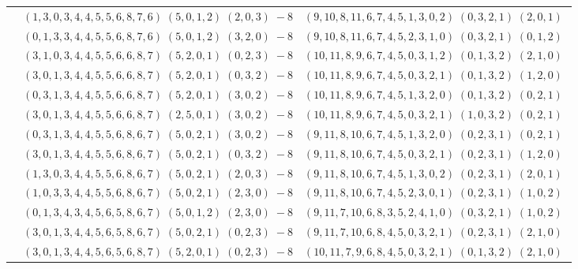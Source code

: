 \documentclass[11pt]{article}
\begin{document}
\begin{longtable}[l]{|c|c|c|}
 \cline{2-3} 
 & $(1 ,3 ,0 ,3 ,4 ,4 ,5 ,5 ,6 ,8 ,7 ,6) \;(5 ,0 ,1 ,2) \;(2 ,0 ,3) \;-8$ & $(9 ,10 ,8 ,11 ,6 ,7 ,4 ,5 ,1 ,3 ,0 ,2) \;(0 ,3 ,2 ,1) \;(2 ,0 ,1) \;$\\ 
 \cline{2-3} 
 & $(0 ,1 ,3 ,3 ,4 ,4 ,5 ,5 ,6 ,8 ,7 ,6) \;(5 ,0 ,1 ,2) \;(3 ,2 ,0) \;-8$ & $(9 ,10 ,8 ,11 ,6 ,7 ,4 ,5 ,2 ,3 ,1 ,0) \;(0 ,3 ,2 ,1) \;(0 ,1 ,2) \;$\\ 
 \cline{2-3} 
 & $(3 ,1 ,0 ,3 ,4 ,4 ,5 ,5 ,6 ,6 ,8 ,7) \;(5 ,2 ,0 ,1) \;(0 ,2 ,3) \;-8$ & $(10 ,11 ,8 ,9 ,6 ,7 ,4 ,5 ,0 ,3 ,1 ,2) \;(0 ,1 ,3 ,2) \;(2 ,1 ,0) \;$\\ 
 \cline{2-3} 
 & $(3 ,0 ,1 ,3 ,4 ,4 ,5 ,5 ,6 ,6 ,8 ,7) \;(5 ,2 ,0 ,1) \;(0 ,3 ,2) \;-8$ & $(10 ,11 ,8 ,9 ,6 ,7 ,4 ,5 ,0 ,3 ,2 ,1) \;(0 ,1 ,3 ,2) \;(1 ,2 ,0) \;$\\ 
 \cline{2-3} 
 & $(0 ,3 ,1 ,3 ,4 ,4 ,5 ,5 ,6 ,6 ,8 ,7) \;(5 ,2 ,0 ,1) \;(3 ,0 ,2) \;-8$ & $(10 ,11 ,8 ,9 ,6 ,7 ,4 ,5 ,1 ,3 ,2 ,0) \;(0 ,1 ,3 ,2) \;(0 ,2 ,1) \;$\\ 
 \cline{2-3} 
 & $(3 ,0 ,1 ,3 ,4 ,4 ,5 ,5 ,6 ,6 ,8 ,7) \;(2 ,5 ,0 ,1) \;(3 ,0 ,2) \;-8$ & $(10 ,11 ,8 ,9 ,6 ,7 ,4 ,5 ,0 ,3 ,2 ,1) \;(1 ,0 ,3 ,2) \;(0 ,2 ,1) \;$\\ 
 \cline{2-3} 
 & $(0 ,3 ,1 ,3 ,4 ,4 ,5 ,5 ,6 ,8 ,6 ,7) \;(5 ,0 ,2 ,1) \;(3 ,0 ,2) \;-8$ & $(9 ,11 ,8 ,10 ,6 ,7 ,4 ,5 ,1 ,3 ,2 ,0) \;(0 ,2 ,3 ,1) \;(0 ,2 ,1) \;$\\ 
 \cline{2-3} 
 & $(3 ,0 ,1 ,3 ,4 ,4 ,5 ,5 ,6 ,8 ,6 ,7) \;(5 ,0 ,2 ,1) \;(0 ,3 ,2) \;-8$ & $(9 ,11 ,8 ,10 ,6 ,7 ,4 ,5 ,0 ,3 ,2 ,1) \;(0 ,2 ,3 ,1) \;(1 ,2 ,0) \;$\\ 
 \cline{2-3} 
 & $(1 ,3 ,0 ,3 ,4 ,4 ,5 ,5 ,6 ,8 ,6 ,7) \;(5 ,0 ,2 ,1) \;(2 ,0 ,3) \;-8$ & $(9 ,11 ,8 ,10 ,6 ,7 ,4 ,5 ,1 ,3 ,0 ,2) \;(0 ,2 ,3 ,1) \;(2 ,0 ,1) \;$\\ 
 \cline{2-3} 
 & $(1 ,0 ,3 ,3 ,4 ,4 ,5 ,5 ,6 ,8 ,6 ,7) \;(5 ,0 ,2 ,1) \;(2 ,3 ,0) \;-8$ & $(9 ,11 ,8 ,10 ,6 ,7 ,4 ,5 ,2 ,3 ,0 ,1) \;(0 ,2 ,3 ,1) \;(1 ,0 ,2) \;$\\ 
 \cline{2-3} 
 & $(0 ,1 ,3 ,4 ,3 ,4 ,5 ,6 ,5 ,8 ,6 ,7) \;(5 ,0 ,1 ,2) \;(2 ,3 ,0) \;-8$ & $(9 ,11 ,7 ,10 ,6 ,8 ,3 ,5 ,2 ,4 ,1 ,0) \;(0 ,3 ,2 ,1) \;(1 ,0 ,2) \;$\\ 
 \cline{2-3} 
 & $(3 ,0 ,1 ,3 ,4 ,4 ,5 ,6 ,5 ,8 ,6 ,7) \;(5 ,0 ,2 ,1) \;(0 ,2 ,3) \;-8$ & $(9 ,11 ,7 ,10 ,6 ,8 ,4 ,5 ,0 ,3 ,2 ,1) \;(0 ,2 ,3 ,1) \;(2 ,1 ,0) \;$\\ 
 \cline{2-3} 
 & $(3 ,0 ,1 ,3 ,4 ,4 ,5 ,6 ,5 ,6 ,8 ,7) \;(5 ,2 ,0 ,1) \;(0 ,2 ,3) \;-8$ & $(10 ,11 ,7 ,9 ,6 ,8 ,4 ,5 ,0 ,3 ,2 ,1) \;(0 ,1 ,3 ,2) \;(2 ,1 ,0) \;$\\ 

\end{longtable}
\end{document}
